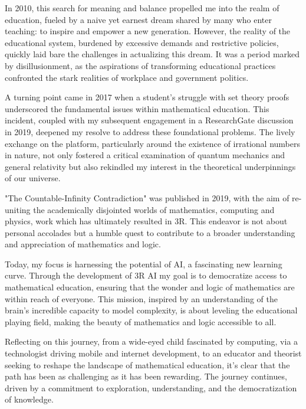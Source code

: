\documentclass[12pt]{article}
\begin{document}
In 2010, this search for meaning and balance propelled me into the realm of education, fueled by a naive yet earnest dream shared by many who enter teaching: to inspire and empower a new generation. However, the reality of the educational system, burdened by excessive demands and restrictive policies, quickly laid bare the challenges in actualizing this dream. It was a period marked by disillusionment, as the aspirations of transforming educational practices confronted the stark realities of workplace and government politics.

A turning point came in 2017 when a student's struggle with set theory proofs underscored the fundamental issues within mathematical education. This incident, coupled with my subsequent engagement in a ResearchGate discussion in 2019, deepened my resolve to address these foundational problems. The lively exchange on the platform, particularly around the existence of irrational numbers in nature, not only fostered a critical examination of quantum mechanics and general relativity but also rekindled my interest in the theoretical underpinnings of our universe.

"The Countable-Infinity Contradiction"\cite{Ed2019xZFC} was published in 2019, with the aim of re-uniting the academically disjointed worlds of mathematics, computing and physics, work which has ultimately resulted in 3R. This endeavor is not about personal accolades but a humble quest to contribute to a broader understanding and appreciation of mathematics and logic.

Today, my focus is harnessing the potential of AI, a fascinating new learning curve. Through the development of 3R AI my goal is to democratize access to mathematical education, ensuring that the wonder and logic of mathematics are within reach of everyone. This mission, inspired by an understanding of the brain's incredible capacity to model complexity, is about leveling the educational playing field, making the beauty of mathematics and logic accessible to all.

Reflecting on this journey, from a wide-eyed child fascinated by computing, via a technologist driving mobile and internet development, to an educator and theorist seeking to reshape the landscape of mathematical education, it's clear that the path has been as challenging as it has been rewarding. The journey continues, driven by a commitment to exploration, understanding, and the democratization of knowledge.


\end{document}
